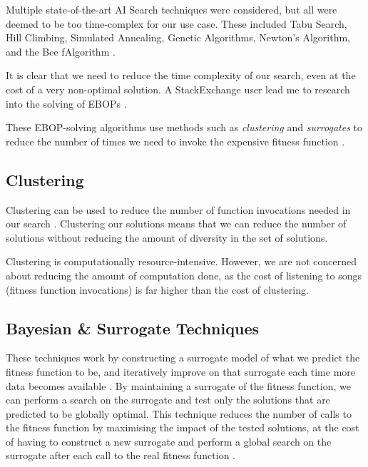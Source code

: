 \documentclass{article}
\begin{document}
	Multiple state-of-the-art AI Search techniques were considered, but all were deemed to be too time-complex for our use case. These included Tabu Search, Hill Climbing, Simulated Annealing, Genetic Algorithms, Newton's Algorithm, and the Bee fAlgorithm \cite{chandel_searching_2014, pham_bee_2005}.
	
	It is clear that we need to reduce the time complexity of our search, even at the cost of a very non-optimal solution. A StackExchange user lead me to research into the solving of EBOPs \cite{stackexchange_search_2018}.
	
	These EBOP-solving algorithms use methods such as \emph{clustering} and \emph{surrogates} to reduce the number of times we need to invoke the expensive fitness function \cite{boukouvala_derivative-free_2014, jones_efficient_1998, dong_surrogate-based_2018}.
	
	\subsection{Clustering}
	Clustering can be used to reduce the number of function invocations needed in our search \cite{boukouvala_derivative-free_2014, wang_time_2017}. Clustering our solutions means that we can reduce the number of solutions without reducing the amount of diversity in the set of solutions.
	
	Clustering is computationally resource-intensive. However, we are not concerned about reducing the amount of computation done, as the cost of listening to songs (fitness function invocations) is far higher than the cost of clustering.
	
	\subsection{Bayesian \& Surrogate Techniques}
	These techniques work by constructing a surrogate model of what we predict the fitness function to be, and iteratively improve on that surrogate each time more data becomes available \cite{mockus_optimization_nodate, dong_surrogate-based_2018}. By maintaining a surrogate of the fitness function, we can perform a search on the surrogate and test only the solutions that are predicted to be globally optimal. This technique reduces the number of calls to the fitness function by maximising the impact of the tested solutions, at the cost of having to construct a new surrogate and perform a global search on the surrogate after each call to the real fitness function \cite{boukouvala_derivative-free_2014}.
	
	\newpage
	\begin{footnotesize}
		\begin{multicols}{2}
			
		\end{multicols}
	\end{footnotesize}
	
\end{document}
